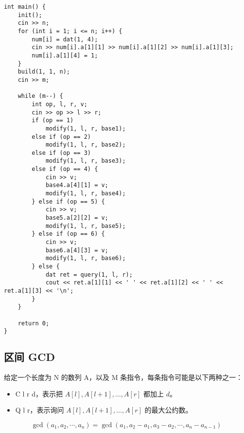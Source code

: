 \begin{verbatim}
int main() {
    init();
    cin >> n;
    for (int i = 1; i <= n; i++) {
        num[i] = dat(1, 4);
        cin >> num[i].a[1][1] >> num[i].a[1][2] >> num[i].a[1][3];
        num[i].a[1][4] = 1;
    }
    build(1, 1, n);
    cin >> m;

    while (m--) {
        int op, l, r, v;
        cin >> op >> l >> r;
        if (op == 1)
            modify(1, l, r, base1);
        else if (op == 2)
            modify(1, l, r, base2);
        else if (op == 3)
            modify(1, l, r, base3);
        else if (op == 4) {
            cin >> v;
            base4.a[4][1] = v;
            modify(1, l, r, base4);
        } else if (op == 5) {
            cin >> v;
            base5.a[2][2] = v;
            modify(1, l, r, base5);
        } else if (op == 6) {
            cin >> v;
            base6.a[4][3] = v;
            modify(1, l, r, base6);
        } else {
            dat ret = query(1, l, r);
            cout << ret.a[1][1] << ' ' << ret.a[1][2] << ' ' << ret.a[1][3] << '\n';
        }
    }

    return 0;
}
\end{verbatim}
\subsection{区间 GCD}

\begin{tcolorbox}
给定一个长度为 N 的数列 A，以及 M 条指令，每条指令可能是以下两种之一：
\begin{itemize}
\item C l r d，表示把 $A[l],A[l+1],…,A[r]$ 都加上 $d$。
\item Q l r，表示询问 $A[l],A[l+1],…,A[r]$ 的最大公约数。
\end{itemize}
\end{tcolorbox}

$$
\operatorname{gcd}\left(a_1, a_2, \cdots, a_n\right)=\operatorname{gcd}\left(a_1, a_2-a_1, a_3-a_2, \cdots, a_n-a_{n-1}\right)
$$

